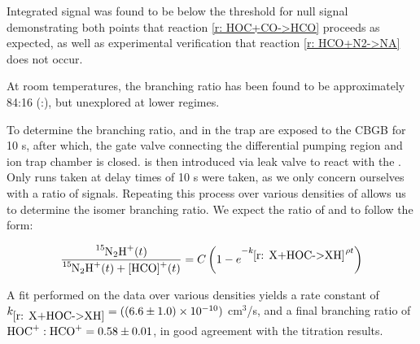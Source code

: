 Integrated  signal was found to be below the threshold for null signal demonstrating both points that reaction \ref{r: HOC+CO->HCO} proceeds as expected, as well as experimental verification that reaction \ref{r: HCO+N2->NA} does not occur.

At room temperatures, the branching ratio has been found to be approximately 84:16 (:)\cite{Freeman1987}, but unexplored at lower regimes.

To determine the branching ratio,  and  in the trap are exposed to the CBGB for 10 s, after which, the gate valve connecting the differential pumping region and ion trap chamber is closed.  is then introduced via leak valve to react with the . Only runs taken at delay times of 10 s were taken, as we only concern ourselves with a ratio of signals. Repeating this process over various densities of  allows us to determine the isomer branching ratio. We expect the ratio of  and \ce{[HCO]+} to follow the form:

\begin{equation}
	\frac{\ce{^{15}N2H+}(t)}{\ce{^{15}N2H+}(t)+\ce{[HCO]+}(t)} = C \left( 1-e^{-k_{\ref{r: X+HOC->XH}} \rho t} \right)
	\label{eq: N2 asymptote}
\end{equation}

A fit performed on the data over various densities yields a rate constant of $k_{\ref{r: X+HOC->XH}} = ((6.6 \pm 1.0) \times 10^{-10})$ cm$^3$/s, and a final branching ratio of $\ce{HOC+}:\ce{HCO+} = 0.58 \pm 0.01$, in good agreement with the  titration results.

